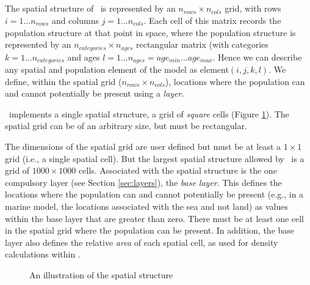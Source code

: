 \subsection{\label{sec:spatial-structure}}

The spatial structure of \SPM\ is represented by an $n_{rows} \times n_{cols}$ grid, with rows $i=1 \dots n_{rows}$ and columns $j=1 \ldots n_{cols}$. Each cell of this matrix records the population structure at that point in space, where the population structure is represented by an $n_{categories} \times n_{ages}$ rectangular matrix (with categories $k=1 \ldots n_{categories}$ and ages $l=1 \ldots n_{ages} = age_{min} \ldots age_{max}$. Hence we can describe any spatial and population element of the model as element$(i,j,k,l)$. We define, within the spatial grid ($n_{rows} \times n_{cols}$), locations where the population can and cannot potentially be present using a \emph{layer}. 

\SPM\ implements a single spatial structure, a grid of \emph{square} cells (Figure \ref{fig:SquareSpatialStructure}). The spatial grid can be of an arbitrary size, but must be rectangular. 

The dimensions of the spatial grid are user defined but must be at least a $1 \times 1$ grid (i.e., a single spatial cell). But the largest spatial structure allowed by \SPM\ is a grid of $1000 \times 1000$ cells. Associated with the spatial structure is the one compulsory layer (see Section \ref{sec:layers}), the \emph{base layer}. This defines the locations where the population can and cannot potentially be present (e.g., in a marine model, the locations associated with the sea and not land) as values within the base layer that are greater than zero. There must be at least one cell in the spatial grid where the population can be present. In addition, the base layer also defines the relative \emph{area} of each spatial cell, as used for density calculations within \SPM.

\begin{figure}[htp]
 \centering
  \caption{An illustration of the spatial structure}
  \label{fig:SquareSpatialStructure}
\end{figure}

